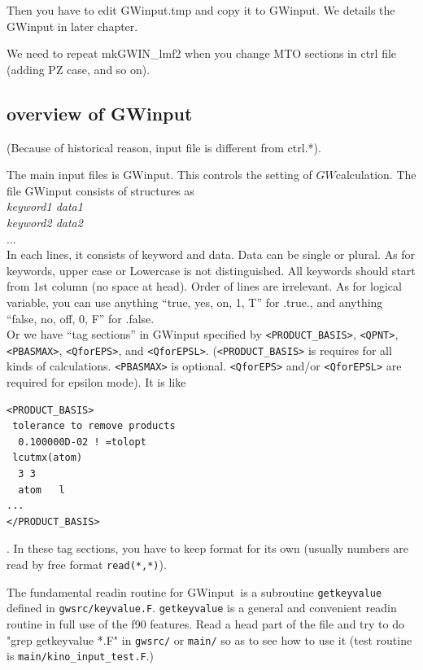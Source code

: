 \documentclass[a4paper,10pt,epsf,fleqn]{article}
\newcommand{\GW}{$GW$}
\newcommand{\GWinput}{{\sf GWinput}\ }
\newcommand{\io}[1]{{\sf  #1}}
\begin{document}
{Then you have to edit {\sf GWinput.tmp} and copy it to
{\sf GWinput}. We details the {\sf GWinput} in later chapter.

We need to repeat mkGWIN\_lmf2
when you change MTO sections in ctrl file (adding PZ case, and so on).


\subsection{overview of GWinput}
(Because of historical reason, input file is different from \io{ctrl.*}).

The main input files is {\sf GWinput}.
This controls the setting of \GW calculation.
The file {\sf GWinput} consists of
structures as\\
{\it keyword1 data1}\\
{\it keyword2 data2}\\
...\\
In each lines, it consists of keyword and data. 
Data can be single or plural.
As for keywords, upper case or Lowercase is not distinguished.
All keywords should start from 1st column (no space at head).
Order of lines are irrelevant.
As for logical variable, you can use 
anything ``true, yes, on, 1, T'' for .true.,
and anything ``false, no, off, 0, F'' for .false.\\

Or we have ``tag sections'' in {\sf GWinput} 
specified by \verb#<PRODUCT_BASIS>#, 
\verb#<QPNT>#,  \verb#<PBASMAX>#, \verb#<QforEPS>#, and \verb#<QforEPSL>#.
(\verb#<PRODUCT_BASIS># is requires for all kinds of calculations.
\verb#<PBASMAX># is optional. \verb#<QforEPS># and/or \verb#<QforEPSL># are required
for epsilon mode). It is like
\begin{verbatim}
<PRODUCT_BASIS>
 tolerance to remove products
  0.100000D-02 ! =tolopt
 lcutmx(atom) 
  3 3 
  atom   l
...
</PRODUCT_BASIS>
\end{verbatim}
. In these tag sections, you have to keep format for its own
(usually numbers are read by free format \verb#read(*,*)#).

The fundamental readin routine for \GWinput is a subroutine 
\verb#getkeyvalue# defined in \verb#gwsrc/keyvalue.F#.
\verb#getkeyvalue# is a general and convenient readin routine in full use of the f90 features.
Read a head part of the file and try to do "grep getkeyvalue *.F" 
in \verb#gwsrc/# or \verb#main/# so as to see how to use it
(test routine is \verb#main/kino_input_test.F#.)

}
\end{document}
